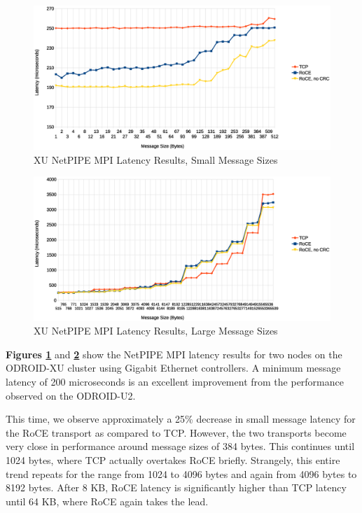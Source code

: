 \documentclass[11pt]{book}
\begin{document}
\begin{figure}[h]
\includegraphics[width=\textwidth]{xu_lat_small}
\caption{XU NetPIPE MPI Latency Results, Small Message Sizes}
\label{xu-lat-small}
\end{figure}

\begin{figure}[h]
\includegraphics[width=\textwidth]{xu_lat_large}
\caption{XU NetPIPE MPI Latency Results, Large Message Sizes}
\label{xu-lat-large}
\end{figure}

\textbf{Figures \ref{xu-lat-small}} and \textbf{\ref{xu-lat-large}} show the
NetPIPE MPI latency results for two nodes on the ODROID-XU cluster using Gigabit
Ethernet controllers. A minimum message latency of 200 microseconds is an
excellent improvement from the performance observed on the ODROID-U2.

This time, we observe approximately a 25\% decrease in small message latency for
the RoCE transport as compared to TCP. However, the two transports become very
close in performance around message sizes of 384 bytes. This continues until
1024 bytes, where TCP actually overtakes RoCE briefly. Strangely, this entire
trend repeats for the range from 1024 to 4096 bytes and again from 4096 bytes to
8192 bytes. After 8 KB, RoCE latency is significantly higher than TCP latency
until 64 KB, where RoCE again takes the lead.
\end{document}
